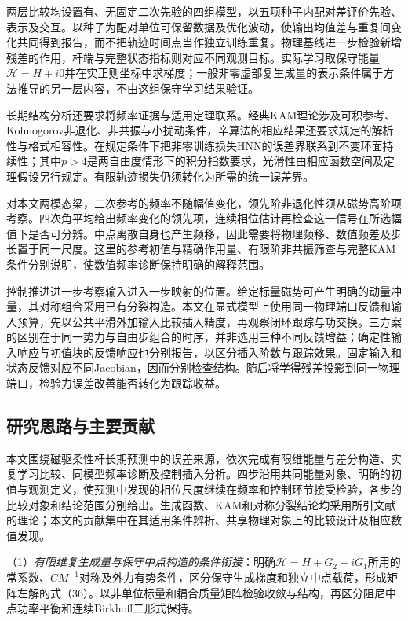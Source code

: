 两层比较均设置有、无固定二次先验的四组模型，以五项种子内配对差评价先验、表示及交互。以种子为配对单位可保留数据及优化波动，使输出均值差与重复间变化共同得到报告，而不把轨迹时间点当作独立训练重复。物理基线进一步检验新增残差的作用，杆端与完整状态指标则对应不同观测目标。实际学习取保守能量$\mathcal H=H+i0$并在实正则坐标中求梯度；一般非零虚部复生成量的表示条件属于方法推导的另一层内容，不由这组保守学习结果验证。

长期结构分析还要求将频率证据与适用定理联系。经典KAM理论涉及可积参考、Kolmogorov非退化、非共振与小扰动条件\citep{Poschel2001}，辛算法的相应结果还要求规定的解析性与格式相容性\citep[定理1]{Shang1999}。\citet[定理11]{Chen2022}在规定条件下把非零训练损失HNN的误差界联系到不变环面持续性；其中$p>4$是两自由度情形下的积分指数要求，光滑性由相应函数空间及定理假设另行规定。有限轨迹损失仍须转化为所需的统一误差界。

对本文两模态梁，二次参考的频率不随幅值变化，领先阶非退化性须从磁势高阶项考察。四次角平均给出频率变化的领先项，连续相位估计再检查这一信号在所选幅值下是否可分辨。中点离散自身也产生频移，因此需要将物理频移、数值频差及步长置于同一尺度。这里的参考初值与精确作用量、有限阶非共振筛查与完整KAM条件分别说明，使数值频率诊断保持明确的解释范围。

控制推进进一步考察输入进入一步映射的位置。给定标量磁势可产生明确的动量冲量，其对称组合采用已有分裂构造\citep{Strang1968}。本文在显式模型上使用同一物理端口反馈和输入预算，先以公共平滑外加输入比较插入精度，再观察闭环跟踪与功交换。三方案的区别在于同一势力与自由步组合的时序，并非选用三种不同反馈增益；确定性输入响应与初值块的反馈响应也分别报告，以区分插入阶数与跟踪效果。固定输入和状态反馈对应不同Jacobian，因而分别检查结构。随后将学得残差投影到同一物理端口，检验力误差改善能否转化为跟踪收益。

\subsection{研究思路与主要贡献}

本文围绕磁驱柔性杆长期预测中的误差来源，依次完成有限维能量与差分构造、实复学习比较、同模型频率诊断及控制插入分析。四步沿用共同能量对象、明确的初值与观测定义，使预测中发现的相位尺度继续在频率和控制环节接受检验，各步的比较对象和结论范围分别给出。生成函数、KAM和对称分裂结论均采用所引文献的理论；本文的贡献集中在其适用条件辨析、共享物理对象上的比较设计及相应数值发现。

\noindent（1）\emph{有限维复生成量与保守中点构造的条件衔接}：明确$\mathcal H=H+G_2-iG_1$所用的常系数、$CM^{-1}$对称及外力有势条件，区分保守生成梯度和独立中点载荷，形成矩阵左解的式（36）。以非单位标量和耦合质量矩阵检验收敛与结构，再区分阻尼中点功率平衡和连续Birkhoff二形式保持。

